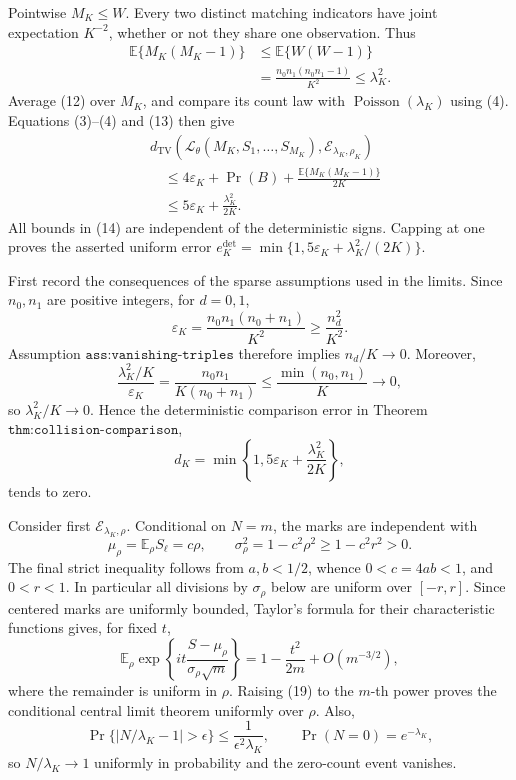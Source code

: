 Pointwise \(M_K\le W\).  Every two distinct matching indicators have
joint expectation \(K^{-2}\), whether or not they share one observation.
Thus
\[
\begin{aligned}
 \mathbb E\{M_K(M_K-1)\}
 &\le\mathbb E\{W(W-1)\}\\
 &=\frac{n_0n_1(n_0n_1-1)}{K^2}
 \le\lambda_K^2.
\end{aligned}
\tag{13}
\]
Average (12) over \(M_K\), and compare its count law with
\(\operatorname{Poisson}(\lambda_K)\) using (4).  Equations
(3)--(4) and (13) then give
\[
\begin{aligned}
 &d_{\mathrm{TV}}\!\left(
 \mathcal L_\theta(M_K,S_1,\ldots,S_{M_K}),
 \mathcal E_{\lambda_K,\rho_K}\right)\\
 &\quad\le
 4\varepsilon_K+\Pr(B)
 +\frac{\mathbb E\{M_K(M_K-1)\}}{2K}\\
 &\quad\le
 5\varepsilon_K+\frac{\lambda_K^2}{2K}.
\end{aligned}
\tag{14}
\]
All bounds in (14) are independent of the deterministic signs.  Capping
at one proves the asserted uniform error
\(e_K^{\mathrm{det}}=\min\{1,5\varepsilon_K+\lambda_K^2/(2K)\}\).

First record the consequences of the sparse assumptions used in the
limits.  Since \(n_0,n_1\) are positive integers, for \(d=0,1\),
\[
 \varepsilon_K
 =\frac{n_0n_1(n_0+n_1)}{K^2}
 \ge \frac{n_d^2}{K^2}.
 \tag{15}
\]
Assumption \(\texttt{ass:vanishing-triples}\) therefore implies
\(n_d/K\to0\).  Moreover,
\[
 \frac{\lambda_K^2/K}{\varepsilon_K}
 =
 \frac{n_0n_1}{K(n_0+n_1)}
 \le\frac{\min(n_0,n_1)}K
 \longrightarrow0,
 \tag{16}
\]
so \(\lambda_K^2/K\to0\).  Hence the deterministic comparison error in
Theorem \(\texttt{thm:collision-comparison}\),
\[
 d_K=\min\left\{1,5\varepsilon_K+\frac{\lambda_K^2}{2K}\right\},
 \tag{17}
\]
tends to zero.

Consider first \(\mathcal E_{\lambda_K,\rho}\).  Conditional on \(N=m\),
the marks are independent with
\[
 \mu_\rho=\mathbb E_\rho S_\ell=c\rho,
 \qquad
 \sigma_\rho^2=1-c^2\rho^2
 \ge1-c^2r^2>0.
 \tag{18}
\]
The final strict inequality follows from \(a,b<1/2\), whence
\(0<c=4ab<1\), and \(0<r<1\).  In particular all divisions by
\(\sigma_\rho\) below are uniform over \([-r,r]\).  Since centered marks
are uniformly bounded, Taylor's formula for their characteristic
functions gives, for fixed \(t\),
\[
 \mathbb E_\rho\exp\left\{
 it\frac{S-\mu_\rho}{\sigma_\rho\sqrt m}
 \right\}
 =1-\frac{t^2}{2m}+O(m^{-3/2}),
 \tag{19}
\]
where the remainder is uniform in \(\rho\).  Raising (19) to the
\(m\)-th power proves the conditional central limit theorem uniformly
over \(\rho\).  Also,
\[
 \Pr\{|N/\lambda_K-1|>\epsilon\}
 \le\frac{1}{\epsilon^2\lambda_K},
 \qquad
 \Pr(N=0)=e^{-\lambda_K},
 \tag{20}
\]
so \(N/\lambda_K\to1\) uniformly in probability and the zero-count
event vanishes.

